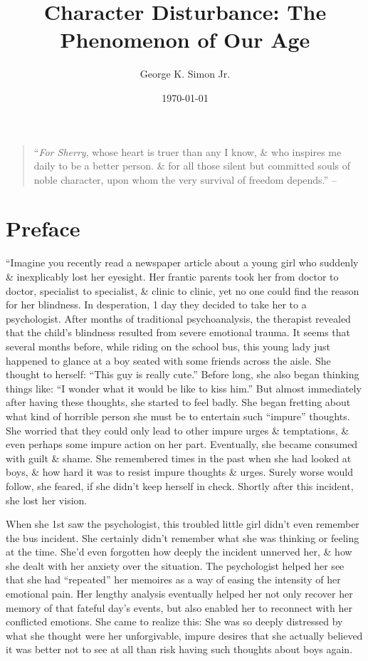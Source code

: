 \documentclass{article}
\title{Character Disturbance: The Phenomenon of Our Age}
\author{George K. Simon Jr.}
\date{\today}
\numberwithin{equation}{section}
\begin{document}
\maketitle
\tableofcontents
\begin{quotation}
	``\textit{For Sherry}, whose heart is truer than any I know, \& who inspires me daily to be a better person. \& for all those silent but committed souls of noble character, upon whom the very survival of freedom depends.'' -- \cite{Simon2011}
\end{quotation}


\section*{Preface}
``Imagine you recently read a newspaper article about a young girl who suddenly \& inexplicably lost her eyesight. Her frantic parents took her from doctor to doctor, specialist to specialist, \& clinic to clinic, yet no one could find the reason for her blindness. In desperation, 1 day they decided to take her to a psychologist. After months of traditional psychoanalysis, the therapist revealed that the child's blindness resulted from severe emotional trauma. It seems that several months before, while riding on the school bus, this young lady just happened to glance at a boy seated with some friends across the aisle. She thought to herself: ``This guy is really cute.'' Before long, she also began thinking things like: ``I wonder what it would be like to kiss him.'' But almost immediately after having these thoughts, she started to feel badly. She began fretting about what kind of horrible person she must be to entertain such ``impure'' thoughts. She worried that they could only lead to other impure urges \& temptations, \& even perhaps some impure action on her part. Eventually, she became consumed with guilt \& shame. She remembered times in the past when she had looked at boys, \& how hard it was to resist impure thoughts \& urges. Surely worse would follow, she feared, if she didn't keep herself in check. Shortly after this incident, she lost her vision.

When she 1st saw the psychologist, this troubled little girl didn't even remember the bus incident. She certainly didn't remember what she was thinking or feeling at the time. She'd even forgotten how deeply the incident unnerved her, \& how she dealt with her anxiety over the situation. The psychologist helped her see that she had ``repeated'' her memoires as a way of easing the intensity of her emotional pain. Her lengthy analysis eventually helped her not only recover her memory of that fateful day's events, but also enabled her to reconnect with her conflicted emotions. She came to realize this: She was so deeply distressed by what she thought were her unforgivable, impure desires that she actually believed it was better not to see at all than risk having such thoughts about boys again.
\end{document}

